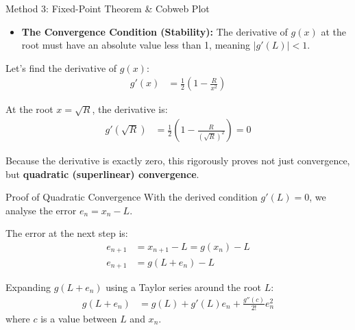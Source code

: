 \documentclass{beamer}
\theoremstyle{remark}
\providecommand{\abs}[1]{\left\vert#1\right\vert}
\numberwithin{equation}{section}
\begin{document}
\begin{frame}{Method 3: Fixed-Point Theorem \& Cobweb Plot}
    \begin{itemize}
        \item \textbf{The Convergence Condition (Stability):} The derivative of $g(x)$ at the root must have an absolute value less than 1, meaning $\abs{g'(L)} < 1$.
    \end{itemize}
    
    Let's find the derivative of $g(x)$:
    \begin{align}
        g'(x) &= \frac{1}{2}\left(1 - \frac{R}{x^2}\right)
    \end{align}
    
    At the root $x = \sqrt{R}$, the derivative is:
    \begin{align}
        g'\left(\sqrt{R}\right) &= \frac{1}{2}\left(1 - \frac{R}{(\sqrt{R})^2}\right) = 0
    \end{align}
    
    Because the derivative is exactly zero, this rigorously proves not just convergence, but \textbf{quadratic (superlinear) convergence}.
\end{frame}
\begin{frame}{Proof of Quadratic Convergence}
    With the derived condition $g'(L) = 0$, we analyse the error $e_n = x_n - L$. 
    
    \vspace{0.3cm}
    The error at the next step is:
    \begin{align}
        e_{n+1} &= x_{n+1} - L = g(x_n) - L \\
        e_{n+1} &= g(L + e_n) - L
    \end{align}
    
    Expanding $g(L + e_n)$ using a Taylor series around the root $L$:
    \begin{align}
        g(L + e_n) &= g(L) + g'(L)e_n + \frac{g''(c)}{2!}e_n^2
    \end{align}
    where $c$ is a value between $L$ and $x_n$.
\end{frame}
\end{document}
